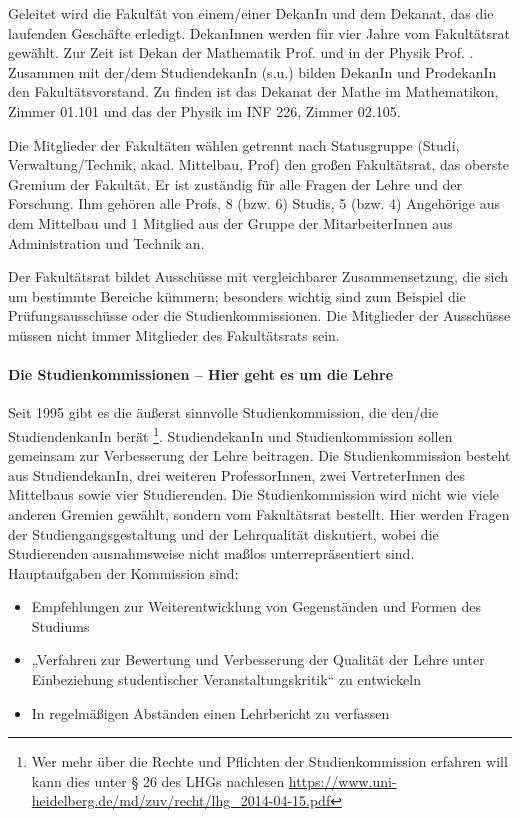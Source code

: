 Geleitet wird die Fakultät von einem/einer DekanIn und dem Dekanat, das die laufenden Geschäfte erledigt. DekanInnen werden für vier Jahre vom Fakultätsrat gewählt. Zur Zeit ist Dekan der Mathematik Prof. \dekanmathe{} und in der Physik Prof. \dekanphysik. Zusammen mit der/dem StudiendekanIn (s.u.) bilden DekanIn und ProdekanIn den Fakultätsvorstand. Zu finden ist das Dekanat der Mathe im \Gls{Mathematikon}, Zimmer 01.101 und das der Physik im INF 226, Zimmer 02.105.

Die Mitglieder der Fakultäten wählen getrennt nach Statusgruppe (Studi, Verwaltung/Technik, akad. Mittelbau, Prof) den großen Fakultätsrat, das oberste Gremium der Fakultät. Er ist zuständig für alle Fragen der Lehre und der Forschung. Ihm gehören alle Profs, 8 (bzw. 6) Studis, 5 (bzw. 4) Angehörige aus dem Mittelbau und 1 Mitglied aus der Gruppe der MitarbeiterInnen aus Administration und Technik an.

Der Fakultätsrat bildet Ausschüsse mit vergleichbarer Zusammensetzung, die sich um bestimmte Bereiche kümmern; besonders wichtig sind zum Beispiel die Prüfungsausschüsse oder die Studienkommissionen. Die Mitglieder der Ausschüsse müssen nicht immer Mitglieder des Fakultätsrats sein.


\paragraph{Die Studienkommissionen -- Hier geht es um die Lehre}

Seit 1995 gibt es die äußerst sinnvolle Studienkommission, die den/die StudiendenkanIn berät \footnote{Wer mehr über die Rechte und Pflichten der Studienkommission erfahren will kann dies unter § 26 des LHGs nachlesen \url{https://www.uni-heidelberg.de/md/zuv/recht/lhg_2014-04-15.pdf}}. StudiendekanIn und Studienkommission sollen gemeinsam zur Verbesserung der Lehre beitragen. Die Studienkommission besteht aus StudiendekanIn, drei weiteren ProfessorInnen, zwei VertreterInnen des Mittelbaus sowie vier Studierenden. Die Studienkommission wird nicht wie viele anderen Gremien gewählt, sondern vom Fakultätsrat bestellt. Hier werden Fragen der Studiengangsgestaltung und der Lehrqualität diskutiert, wobei die Studierenden ausnahmsweise nicht maßlos unterrepräsentiert sind. Hauptaufgaben der Kommission sind:
\begin{itemize}
    \addtolength{\itemsep}{-0.7\baselineskip}
    \item Empfehlungen zur Weiterentwicklung von Gegenständen und Formen des Studiums
    \item „Verfahren zur Bewertung und Verbesserung der Qualität der Lehre unter
          Einbeziehung studentischer Veranstaltungskritik“ zu entwickeln
    \item In regelmäßigen Abständen einen Lehrbericht zu verfassen
\end{itemize}

